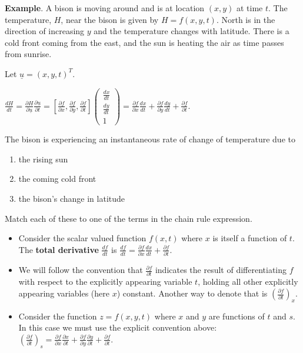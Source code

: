 \documentclass[12pt,letterpaper,noanswers]{exam}
\newcommand{\mb}[1]{\underline{#1}}
\begin{document}
    \eject
    
    \noindent\textbf{Example}.  A bison is moving around and is at location $(x,y)$ at time $t$.  The temperature, $H$, near the bison is given by $H = f(x,y,t)$.  North is in the direction of increasing $y$ and the temperature changes with latitude.  There is a cold front coming from the east, and the sun is heating the air as time passes from sunrise.  
 
 Let $\underline{u} = (x,y,t)^T$.
 
 $\displaystyle\frac{dH}{dt} = \frac{\partial H}{\partial\mb{u}}\frac{\partial\mb{u}}{\partial t} = \left[\frac{\partial f}{\partial x}, \frac{\partial f}{\partial y}, \frac{\partial f}{\partial t}\right]\left(\begin{array}{c} \frac{dx}{dt} \\ \frac{dy}{dt} \\ 1 \end{array}\right) = \frac{\partial f}{\partial x}\frac{dx}{dt} + \frac{\partial f}{\partial y}\frac{dy}{dt} + \frac{\partial f}{\partial t}$.
 
 The bison is experiencing an instantaneous rate of change of temperature due to 
 \begin{enumerate}
     \item the rising sun
     \item the coming cold front
     \item the bison's change in latitude
 \end{enumerate}
 
 Match each of these to one of the terms in the chain rule expression.
 \vspace{1in}
    
    \begin{tcolorbox}
    \begin{itemize}
        \itemsep0em
    \item Consider the scalar valued function $f(x,t)$ where $x$ is itself a function of $t$.  The \textbf{total derivative} $\displaystyle\frac{df}{dt}$ is $\displaystyle\frac{df}{dt} = \frac{\partial f}{\partial x}\frac{dx}{dt} + \frac{\partial f}{\partial t}$.
    \item We will follow the convention that $\displaystyle\frac{\partial f}{\partial t}$ indicates the result of differentiating $f$ with respect to the explicitly appearing variable $t$, holding all other explicitly appearing variables (here $x$) constant.  Another way to denote that is $\displaystyle\left(\frac{\partial f}{\partial t}\right)_x$.
    \item Consider the function $z = f(x,y,t)$ where $x$ and $y$ are functions of $t$ and $s$.  In this case we must use the explicit convention above: $\displaystyle\left(\frac{\partial f}{\partial t}\right)_s = \frac{\partial f}{\partial x}\frac{\partial x}{\partial t} + \frac{\partial f}{\partial y}\frac{\partial y}{\partial t} + \frac{\partial f}{\partial t}$.
\end{itemize}


\end{tcolorbox}
\end{document}
